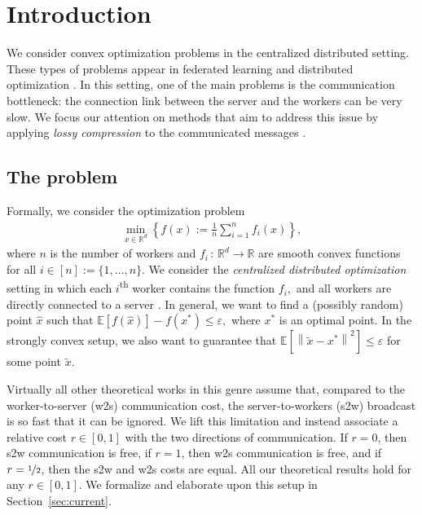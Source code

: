 \documentclass{article} %
\newcommand{\norm}[1]{\left\| #1 \right\|}
\newcommand{\R}{\mathbb{R}} %
\newcommand{\Exp}[1]{{\mathbb{E}}\left[#1\right]}
\theoremstyle{plain}
\theoremstyle{definition}
\theoremstyle{remark}
\newcommand{\eqdef}{:=}
\newcommand{\squeeze}{\textstyle}
\begin{document}
\section{Introduction}

We consider convex optimization problems in the centralized distributed setting. These types of problems appear in federated learning \citep{konevcny2016federated, mcmahan2017communication} and distributed optimization \citep{ramesh2021zero}. In this setting, one of the main problems is the communication bottleneck: the connection link between the server and the workers can be very slow. We focus our attention on methods that aim to address this issue by applying {\em lossy compression} to the communicated messages \citep{alistarh2017qsgd, DIANA,gruntkowska2022ef21}.  

\subsection{The problem} Formally, we consider the  optimization problem
\begin{align}
   \label{eq:main_task}
 \squeeze \min \limits_{x \in \R^d} \left\{f(x) \eqdef \frac{1}{n} \sum\limits_{i=1}^n f_i(x)\right\},
\end{align}
where $n$ is the number of workers and $f_i \,:\, \R^d \rightarrow \R$ are smooth convex functions for all $i \in [n] \eqdef \{1, \dots, n\}.$ We consider the {\em centralized distributed optimization} setting in which
 each $i$\textsuperscript{th} worker contains the function $f_i,$ and all workers are directly connected to a server \citep{kairouz2021advances}.
In general, we want to find a (possibly random) point $\widehat{x}$ such that $\Exp{f(\widehat{x})} - f(x^*) \leq \varepsilon,$ where $x^*$ is an optimal point. In the strongly convex setup, we also want to guarantee that $\mathbb{E}[\norm{\widetilde{x} - x^*}^2] \leq \varepsilon$ for some point $\widetilde{x}.$

Virtually all other theoretical works in this genre assume that, compared to the worker-to-server (w2s) communication cost, the server-to-workers (s2w) broadcast is so fast  that it can be ignored. We lift this limitation and instead associate a relative cost $r \in [0,1]$ with the two directions of communication. If $r=0$, then s2w communication is free,  if $r=1$, then w2s communication is free, and if $r=\nicefrac{1}{2}$, then the s2w and w2s costs are equal.  All our theoretical results hold for any $r \in [0,1]$. We formalize and elaborate upon this setup in Section~\ref{sec:current}.
\end{document}
